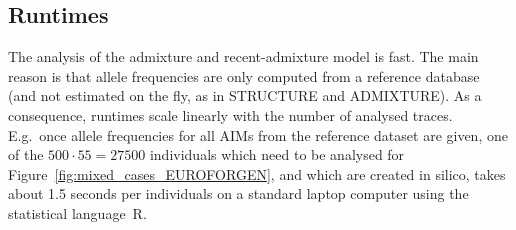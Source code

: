 \documentclass[12pt]{article}
\theoremstyle{definition}
\newcommand\crule[3][black]{\textcolor{#1}{\rule{#2}{#3}}}
\begin{document}



%   

\subsection{Runtimes} 
The analysis of the admixture and recent-admixture model is fast. The
main reason is that allele frequencies are only computed from a
reference database (and not estimated on the fly, as in {\sc
  STRUCTURE} and {\sc ADMIXTURE}). As a consequence, runtimes scale
linearly with the number of analysed traces. E.g.\ once allele
frequencies for all AIMs from the reference dataset are given, one of
the $500\cdot 55 = 27500$ individuals which need to be analysed for
Figure~\ref{fig:mixed_cases_EUROFORGEN}, and which are created in
silico, takes about 1.5 seconds per individuals on a standard laptop
computer using the statistical language~R.
\end{document}
